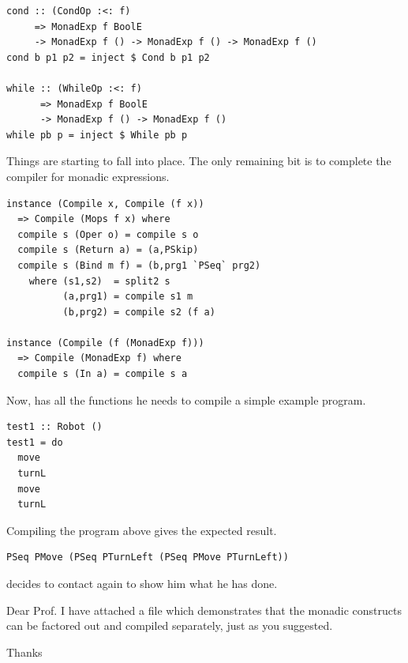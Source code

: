 \begin{small}
\begin{verbatim}
cond :: (CondOp :<: f) 
     => MonadExp f BoolE 
     -> MonadExp f () -> MonadExp f () -> MonadExp f ()
cond b p1 p2 = inject $ Cond b p1 p2

while :: (WhileOp :<: f) 
      => MonadExp f BoolE 
      -> MonadExp f () -> MonadExp f ()
while pb p = inject $ While pb p
\end{verbatim}
\end{small}

Things are starting to fall into place. The only remaining bit is to
complete the compiler for monadic expressions.

\begin{small}
\begin{verbatim}
instance (Compile x, Compile (f x)) 
  => Compile (Mops f x) where
  compile s (Oper o) = compile s o
  compile s (Return a) = (a,PSkip)
  compile s (Bind m f) = (b,prg1 `PSeq` prg2) 
    where (s1,s2)  = split2 s
          (a,prg1) = compile s1 m
          (b,prg2) = compile s2 (f a)

instance (Compile (f (MonadExp f))) 
  => Compile (MonadExp f) where
  compile s (In a) = compile s a
\end{verbatim}
\end{small}

Now, \studname{} has all the functions he needs to compile a simple
example program.

\begin{small}
\begin{verbatim}
test1 :: Robot () 
test1 = do 
  move
  turnL
  move 
  turnL 
\end{verbatim}
\end{small}

Compiling the program above gives the expected result. 

\begin{small}
\begin{verbatim}
PSeq PMove (PSeq PTurnLeft (PSeq PMove PTurnLeft))
\end{verbatim}
\end{small}


\studname{} decides to contact \docname{} again to show him what 
he has done.

\vspace{5mm}

\noindent\colorbox{light-gray}{
\begin{minipage}[]{0.9\linewidth}
\noindent 
Dear Prof. \docname{}
\newline \newline
\noindent I have attached a file which demonstrates that the monadic
constructs can be factored out and compiled separately, just as you
suggested.
\newline \newline

\noindent Thanks \newline
\noindent \studname{}
\end{minipage} 
}

